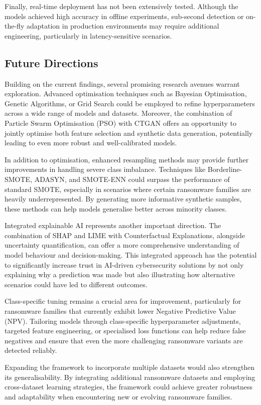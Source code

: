  Finally, real-time deployment has not been extensively tested. Although the models achieved high accuracy in offline experiments, sub-second detection or on-the-fly adaptation in production environments may require additional engineering, particularly in latency-sensitive scenarios.


\subsection{Future Directions}

Building on the current findings, several promising research avenues warrant exploration. Advanced optimisation techniques such as Bayesian Optimisation, Genetic Algorithms, or Grid Search could be employed to refine hyperparameters across a wide range of models and datasets. Moreover, the combination of Particle Swarm Optimisation (PSO) with CTGAN offers an opportunity to jointly optimise both feature selection and synthetic data generation, potentially leading to even more robust and well-calibrated models.

In addition to optimisation, enhanced resampling methods may provide further improvements in handling severe class imbalance. Techniques like Borderline-SMOTE, ADASYN, and SMOTE-ENN could surpass the performance of standard SMOTE, especially in scenarios where certain ransomware families are heavily underrepresented. By generating more informative synthetic samples, these methods can help models generalise better across minority classes.

Integrated explainable AI represents another important direction. The combination of SHAP and LIME with Counterfactual Explanations, alongside uncertainty quantification, can offer a more comprehensive understanding of model behaviour and decision-making. This integrated approach has the potential to significantly increase trust in AI-driven cybersecurity solutions by not only explaining why a prediction was made but also illustrating how alternative scenarios could have led to different outcomes.

Class-specific tuning remains a crucial area for improvement, particularly for ransomware families that currently exhibit lower Negative Predictive Value (NPV). Tailoring models through class-specific hyperparameter adjustments, targeted feature engineering, or specialised loss functions can help reduce false negatives and ensure that even the more challenging ransomware variants are detected reliably.

Expanding the framework to incorporate multiple datasets would also strengthen its generalisability. By integrating additional ransomware datasets and employing cross-dataset learning strategies, the framework could achieve greater robustness and adaptability when encountering new or evolving ransomware families.

